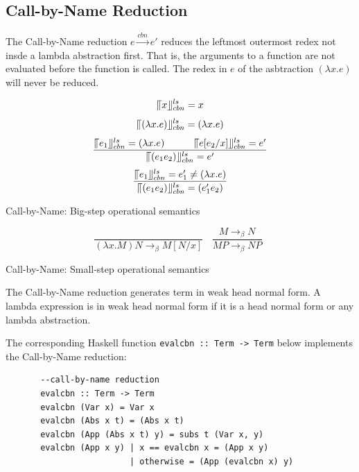\subsection{Call-by-Name Reduction}{\label{subsec:cbn}}

The Call-by-Name reduction $e\xrightarrow{cbn} e'$ reduces the leftmost outermost redex not insde a lambda abstraction first. That is, the arguments to a function are not evaluated before the function is called. The redex in $e$ of the asbtraction $(\lambda x.e)$ will never be reduced. 


\begin{equation*}
\llceil x \rrfloor ^{ls} _{cbn} = x
\end{equation*}
\begin{equation*}
\llceil (\lambda x.e) \rrfloor ^{ls} _{cbn} = (\lambda x.e)
\end{equation*}
\begin{equation*}
\frac{\llceil e_1 \rrfloor ^{ls} _{cbn} = (\lambda x.e)\ \ \ \ \ \ \ \ \ \llceil e[e_2/x] \rrfloor ^{ls} _{cbn} = e'}{\llceil (e_1e_2) \rrfloor ^{ls} _{cbn} = e'}
\end{equation*}
\begin{equation*}
\frac{\llceil e_1 \rrfloor ^{ls} _{cbn} = e'_1\neq (\lambda x.e)}{\llceil (e_1e_2) \rrfloor ^{ls} _{cbn} = (e'_1e_2)}
\end{equation*}
\begin{center}
Call-by-Name: Big-step operational semantics
\end{center}

\begin{equation*}
\frac{}{(\lambda x.M)N \rightarrow _\beta M[N/x]}\ \ \ \  
\frac{M \rightarrow _\beta N}{MP \rightarrow _\beta NP}\ \ 
\end{equation*}
\begin{center}
Call-by-Name: Small-step operational semantics
\end{center}

The Call-by-Name reduction generates term in weak head normal form. A lambda expression is in weak head normal form if it is a head normal form or any lambda abstraction. 


The corresponding Haskell function \verb|evalcbn :: Term -> Term| below implements the Call-by-Name reduction:

\begin{verbatim}
       --call-by-name reduction
       evalcbn :: Term -> Term
       evalcbn (Var x) = Var x
       evalcbn (Abs x t) = (Abs x t)
       evalcbn (App (Abs x t) y) = subs t (Var x, y)
       evalcbn (App x y) | x == evalcbn x = (App x y)
	                     | otherwise = (App (evalcbn x) y) 
\end{verbatim}


